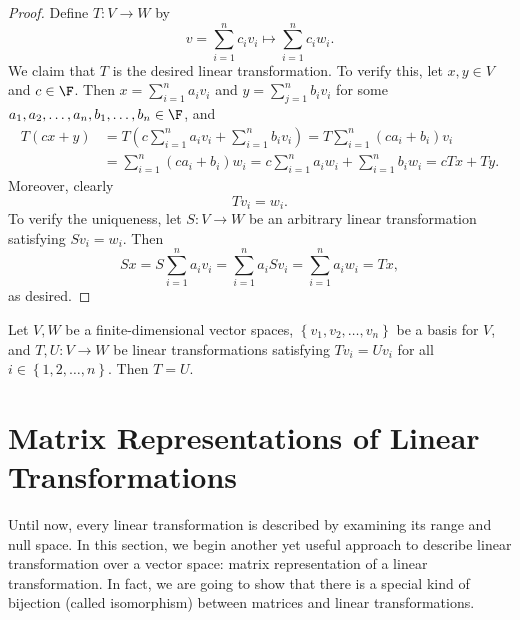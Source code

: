 \documentclass[linearalgebraI]{subfiles}
\begin{document}
    \begin{proof}
        Define $T:V\to W$ by
        \begin{equation*}
            v=\sum^{n}_{i=1} c_iv_i\mapsto \sum^{n}_{i=1} c_iw_i.
        \end{equation*}
        We claim that $T$ is the desired linear transformation. To verify this, let $x, y\in V$ and $c\in \F$. Then $x=\sum^{n}_{i=1} a_iv_i$ and $y=\sum^{n}_{j=1} b_iv_i$ for some $a_1,a_2,\ldots,a_n, b_1,\ldots,b_n\in\F$, and 
        \begin{align*}
            T(cx+y) & = T \left( c\sum^n_{i=1} a_iv_i + \sum^n_{i=1} b_iv_i \right) = T \sum^n_{i=1} (ca_i+b_i)v_i \\
                    & = \sum^n_{i=1} (ca_i+b_i)w_i = c\sum^n_{i=1} a_iw_i + \sum^n_{i=1} b_iw_i = cTx+Ty.
        \end{align*}
        Moreover, clearly
        \begin{equation*}
            Tv_i = w_i.
        \end{equation*}
        To verify the uniqueness, let $S: V\to W$ be an arbitrary linear transformation satisfying $Sv_i = w_i$. Then
        \begin{equation*}
            Sx = S \sum^n_{i=1} a_iv_i = \sum^n_{i=1} a_i Sv_i = \sum^n_{i=1} a_iw_i = Tx,
        \end{equation*}
        as desired.
    \end{proof}

    \begin{cor}{}
        Let $V, W$ be a finite-dimensional vector spaces, $\left\lbrace v_1, v_2, \ldots, v_n \right\rbrace$ be a basis for $V$, and $T,U: V\to W$ be linear transformations satisfying $Tv_i = Uv_i$ for all $i\in \left\lbrace 1, 2, \ldots, n \right\rbrace$. Then $T = U$.
    \end{cor}	

    \section{Matrix Representations of Linear Transformations}

    \begin{remark}
        Until now, every linear transformation is described by examining its range and null space. In this section, we begin another yet useful approach to describe linear transformation over a vector space: matrix representation of a linear transformation. In fact, we are going to show that there is a special kind of bijection (called isomorphism) between matrices and linear transformations.
    \end{remark}
\end{document}
